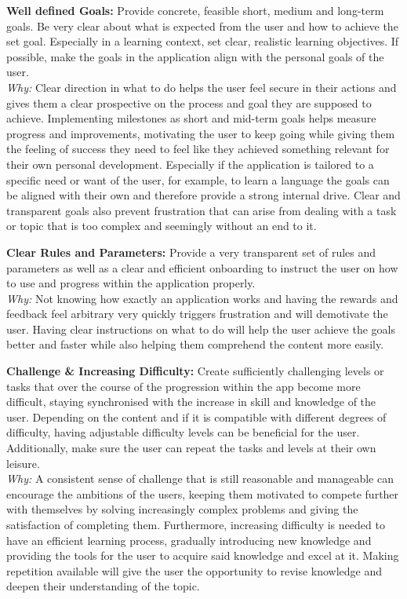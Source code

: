 \textbf{Well defined Goals:}
Provide concrete, feasible short, medium and long-term goals. Be very clear about what is expected from the user and how to achieve the set goal. Especially in a learning context, set clear, realistic learning objectives. If possible, make the goals in the application align with the personal goals of the user. \\ \indent
\textit{Why:} Clear direction in what to do helps the user feel secure in their actions and gives them a clear prospective on the process and goal they are supposed to achieve. Implementing milestones as short and mid-term goals helps measure progress and improvements, motivating the user to keep going while giving them the feeling of success they need to feel like they achieved something relevant for their own personal development. Especially if the application is tailored to a specific need or want of the user, for example, to learn a language the goals can be aligned with their own and therefore provide a strong internal drive.
Clear and transparent goals also prevent frustration that can arise from dealing with a task or topic that is too complex and seemingly without an end to it.

\textbf{Clear Rules and Parameters:}
Provide a very transparent set of rules and parameters as well as a clear and efficient onboarding to instruct the user on how to use and progress within the application properly. \\ \indent
\textit{Why:} Not knowing how exactly an application works and having the rewards and feedback feel arbitrary very quickly triggers frustration and will demotivate the user. Having clear instructions on what to do will help the user achieve the goals better and faster while also helping them comprehend the content more easily.

\textbf{Challenge \& Increasing Difficulty:}
Create sufficiently challenging levels or tasks that over the course of the progression within the app become more difficult, staying synchronised with the increase in skill and knowledge of the user. Depending on the content and if it is compatible with different degrees of difficulty, having adjustable difficulty levels can be beneficial for the user. Additionally, make sure the user can repeat the tasks and levels at their own leisure. \\ \indent
\textit{Why:} A consistent sense of challenge that is still reasonable and manageable can encourage the ambitions of the users, keeping them motivated to compete further with themselves by solving increasingly complex problems and giving the satisfaction of completing them. Furthermore, increasing difficulty is needed to have an efficient learning process, gradually introducing new knowledge and providing the tools for the user to acquire said knowledge and excel at it. Making repetition available will give the user the opportunity to revise knowledge and deepen their understanding of the topic.

